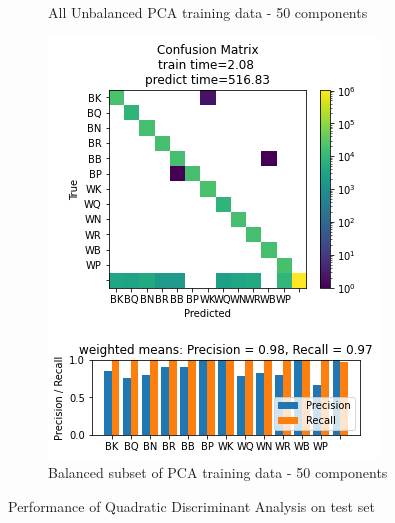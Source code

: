 \documentclass{article}
\newcommand{\FIGLABEL}[1]{Performance of #1 on test set}
\newcommand{\PCAFL}{All Unbalanced PCA training data - 50 components}
\newcommand{\PCABL}{Balanced subset of PCA training data - 50 components}
\begin{document}
\begin{figure}[h]
\begin{subfigure}{0.33\textwidth}
\caption{\PCAFL}
\label{fig:subim2}
\end{subfigure}
\begin{subfigure}{0.33\textwidth}
\includegraphics[width=0.9\linewidth]{QDA_B_PCA50c_160x160_evaluation.png} 
\caption{\PCABL}
\label{fig:subim3}
\end{subfigure}
\caption{\FIGLABEL{Quadratic Discriminant Analysis}}
\label{fig:QDA}
\end{figure}
\end{document}
